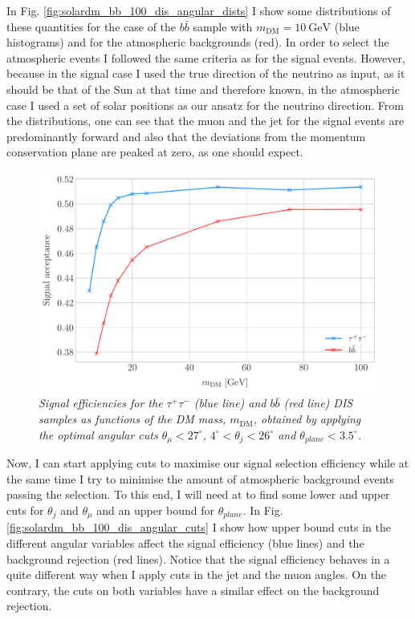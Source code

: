 In Fig. \ref{fig:solardm_bb_100_dis_angular_dists} I show some distributions of these quantities for the case of the $b\bar{b}$ sample with $m_{\mathrm{DM}} = 10 \ \mathrm{GeV}$ (blue histograms) and for the atmospheric backgrounds (red). In order to select the atmospheric events I followed the same criteria as for the signal events. However, because in the signal case I used the true direction of the neutrino as input, as it should be that of the Sun at that time and therefore known, in the atmospheric case I used a set of solar positions as our ansatz for the neutrino direction. From the distributions, one can see that the muon and the jet for the signal events are predominantly forward and also that the deviations from the momentum conservation plane are peaked at zero, as one should expect.

\begin{figure}[t]
	\centering
	\includegraphics[width=0.9\linewidth]{Images/DM_Analysis/solardm_dis_signal_acceptance.pdf}
	\caption{\textit{Signal efficiencies for the $\tau^{+} \tau^{-}$ (blue line) and $b\bar{b}$ (red line) DIS samples as functions of the DM mass, $m_{\mathrm{DM}}$, obtained by applying the optimal angular cuts $\theta_{\mu} < 27^{\circ}$, $4^{\circ} < \theta_{j} < 26^{\circ}$ and $\theta_{plane} < 3.5^{\circ}$.}}
	\label{fig:solardm_dis_efficiency}
\end{figure}

Now, I can start applying cuts to maximise our signal selection efficiency while at the same time I try to minimise the amount of atmospheric background events passing the selection. To this end, I will need at to find some lower and upper cuts for $\theta_{j}$ and $\theta_{\mu}$ and an upper bound for $\theta_{plane}$. In Fig. \ref{fig:solardm_bb_100_dis_angular_cuts} I show how upper bound cuts in the different angular variables affect the signal efficiency (blue lines) and the background rejection (red lines). Notice that the signal efficiency behaves in a quite different way when I apply cuts in the jet and the muon angles. On the contrary, the cuts on both variables have a similar effect on the background rejection.

